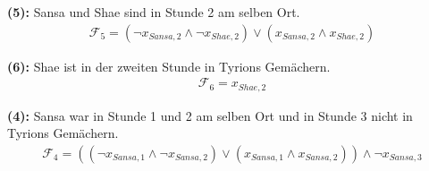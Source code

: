 \documentclass{article}
\begin{document}
\textbf{(5): }Sansa und Shae sind in Stunde 2 am selben Ort.
\begin{align*}
\mathcal{F}_5 = \left( \neg x_{Sansa,2} \wedge \neg x_{Shae,2} \right) \vee \left( x_{Sansa,2} \wedge x_{Shae,2} \right)
\end{align*}

\textbf{(6): }Shae ist in der zweiten Stunde in Tyrions Gemächern.
\begin{align*}
\mathcal{F}_6 = x_{Shae,2}
\end{align*}

\textbf{(4): }Sansa war in Stunde 1 und 2 am selben Ort und in Stunde 3 nicht in Tyrions Gemächern.
\begin{align*}
\mathcal{F}_4 = \left( \left( \neg x_{Sansa,1} \wedge \neg x_{Sansa,2} \right) \vee \left( x_{Sansa,1} \wedge x_{Sansa,2} \right) \right) \wedge \neg x_{Sansa,3}
\end{align*}
\end{document}
